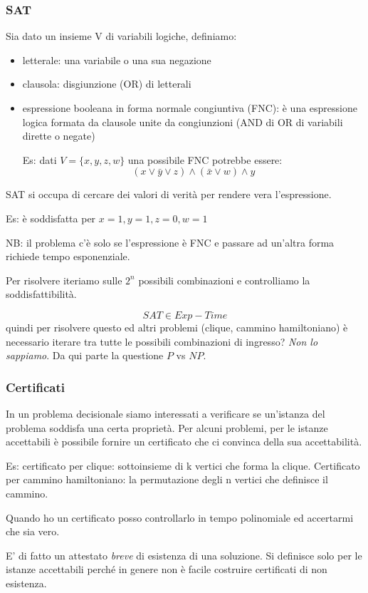 \subsubsection{SAT}
Sia dato un insieme V di variabili logiche, definiamo:
\begin{itemize}
    \item letterale: una variabile o una sua negazione
    \item clausola: disgiunzione (OR) di letterali
    \item espressione booleana in forma normale congiuntiva (FNC): è una espressione logica formata da clausole unite da congiunzioni (AND di OR di variabili dirette o negate)
    
    Es: dati $ V = \{x, y, z, w\}$ una possibile FNC potrebbe essere: 
    $$(x \lor \bar{y} \lor z) \land (\bar{x} \lor w) \land y$$
\end{itemize}

SAT si occupa di cercare dei valori di verità per rendere vera l'espressione.

Es: è soddisfatta per $x=1, y=1, z=0, w=1$

NB: il problema c'è solo se l'espressione è FNC e passare ad un'altra forma richiede tempo esponenziale.

Per risolvere iteriamo sulle $2^n$ possibili combinazioni e controlliamo la soddisfattibilità.

$$ SAT \in Exp-Time$$
quindi per risolvere questo ed altri problemi (clique, cammino hamiltoniano) è necessario iterare tra tutte le possibili combinazioni di ingresso? \emph{Non lo sappiamo}. Da qui parte la questione $P$ vs $NP$.

\subsubsection{Certificati}
In un problema decisionale siamo interessati a verificare se un'istanza del problema soddisfa una certa proprietà. Per alcuni problemi, per le istanze accettabili è possibile fornire un certificato che ci convinca della sua accettabilità.

Es: certificato per clique: sottoinsieme di k vertici che forma la clique. Certificato per cammino hamiltoniano: la permutazione degli n vertici che definisce il cammino.

Quando ho un certificato posso controllarlo in tempo polinomiale ed accertarmi che sia vero.

E' di fatto un attestato \emph{breve} di esistenza di una soluzione. Si definisce solo per le istanze accettabili perché in genere non è facile costruire certificati di non esistenza.

